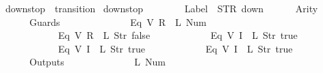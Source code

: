 \begin{isabellebody}
{\isasymrparr}{\isachardoublequoteclose}\isanewline
\isanewline
{}\isamarkupfalse%
\ {\isachardoublequoteopen}down{}{}stop{\isachardoublequoteclose}\ {\isacharcolon}{\isacharcolon}\ {\isachardoublequoteopen}transition{\isachardoublequoteclose}\ \isanewline
{\isachardoublequoteopen}down{}{}stop\ {\isasymequiv}\ {\isasymlparr}\isanewline
\ \ \ \ \ \ Label\ {\isacharequal}\ STR\ {\isacharprime}{\isacharprime}down{\isacharprime}{\isacharprime}{\isacharcomma}\isanewline
\ \ \ \ \ \ Arity\ {\isacharequal}\ {}{\isacharcomma}\isanewline
\ \ \ \ \ \ Guards\ {\isacharequal}\ {\isacharbrackleft}\isanewline
\ \ \ \ \ \ \ \ \ \ \ \ {\isacharparenleft}Eq\ {\isacharparenleft}V\ {\isacharparenleft}R\ {}{\isacharparenright}{\isacharparenright}\ {\isacharparenleft}L\ {\isacharparenleft}Num\ {}{\isacharparenright}{\isacharparenright}{\isacharparenright}{\isacharcomma}\isanewline
\ \ \ \ \ \ \ \ \ \ \ \ {\isacharparenleft}Eq\ {\isacharparenleft}V\ {\isacharparenleft}R\ {}{\isacharparenright}{\isacharparenright}\ {\isacharparenleft}L\ {\isacharparenleft}Str\ {\isacharprime}{\isacharprime}false{\isacharprime}{\isacharprime}{\isacharparenright}{\isacharparenright}{\isacharparenright}{\isacharcomma}\isanewline
\ \ \ \ \ \ \ \ \ \ \ \ {\isacharparenleft}Eq\ {\isacharparenleft}V\ {\isacharparenleft}I\ {}{\isacharparenright}{\isacharparenright}\ {\isacharparenleft}L\ {\isacharparenleft}Str\ {\isacharprime}{\isacharprime}true{\isacharprime}{\isacharprime}{\isacharparenright}{\isacharparenright}{\isacharparenright}{\isacharcomma}\isanewline
\ \ \ \ \ \ \ \ \ \ \ \ {\isacharparenleft}Eq\ {\isacharparenleft}V\ {\isacharparenleft}I\ {}{\isacharparenright}{\isacharparenright}\ {\isacharparenleft}L\ {\isacharparenleft}Str\ {\isacharprime}{\isacharprime}true{\isacharprime}{\isacharprime}{\isacharparenright}{\isacharparenright}{\isacharparenright}{\isacharcomma}\isanewline
\ \ \ \ \ \ \ \ \ \ \ \ {\isacharparenleft}Eq\ {\isacharparenleft}V\ {\isacharparenleft}I\ {}{\isacharparenright}{\isacharparenright}\ {\isacharparenleft}L\ {\isacharparenleft}Str\ {\isacharprime}{\isacharprime}true{\isacharprime}{\isacharprime}{\isacharparenright}{\isacharparenright}{\isacharparenright}\isanewline
\ \ \ \ \ \ {\isacharbrackright}{\isacharcomma}\isanewline
\ \ \ \ \ \ Outputs\ {\isacharequal}\ {\isacharbrackleft}\isanewline
\ \ \ \ \ \ \ \ \ \ \ \ {\isacharparenleft}L\ {\isacharparenleft}Num\ {}{\isacharparenright}{\isacharparenright}{\isacharcomma}\isanewline

\end{isabellebody}

